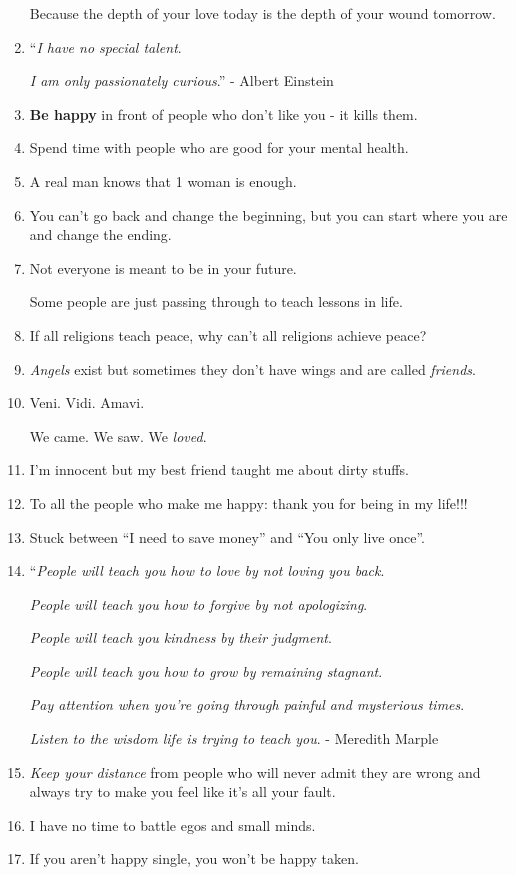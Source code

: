 \documentclass{article}
\begin{document}
\begin{enumerate}
	Because the depth of your love today is the depth of your wound tomorrow.
	\item ``\textit{I have no special talent}.
	
	\textit{I am only passionately curious}.'' - Albert Einstein
	\item \textbf{Be happy} in front of people who don't like you - it kills them.
	\item Spend time with people who are good for your mental health.
	\item A real man knows that 1 woman is enough.
	\item You can't go back and change the beginning, but you can start where you are and change the ending.
	\item Not everyone is meant to be in your future.
	
	Some people are just passing through to teach lessons in life.
	\item If all religions teach peace, why can't all religions achieve peace?
	\item \textit{Angels} exist but sometimes they don't have wings and are called \textit{friends}.
	\item Veni. Vidi. Amavi.
	
	We came. We saw. We \textit{loved}.
	\item I'm innocent but my best friend taught me about dirty stuffs.
	\item To all the people who make me happy: thank you for being in my life!!!
	\item Stuck between ``I need to save money'' and ``You only live once''.
	\item ``\textit{People will teach you how to love by not loving you back}.
	
	\textit{People will teach you how to forgive by not apologizing}.
	
	\textit{People will teach you kindness by their judgment}.
	
	\textit{People will teach you how to grow by remaining stagnant}.
	
	\textit{Pay attention when you're going through painful and mysterious times}.
	
	\textit{Listen to the wisdom life is trying to teach you}. - Meredith Marple
	\item \textit{Keep your distance} from people who will never admit they are wrong and always try to make you feel like it's all your fault.
	\item I have no time to battle egos and small minds.
	\item If you aren't happy single, you won't be happy taken.
	

\end{enumerate}
\end{document}
